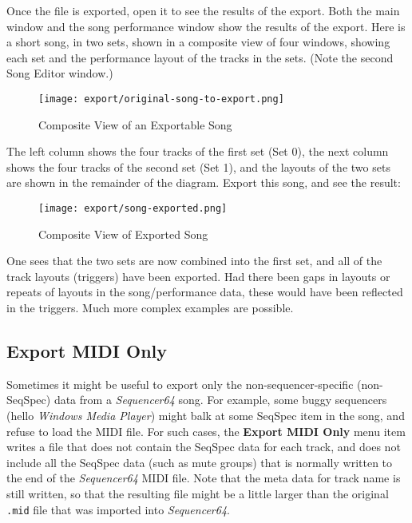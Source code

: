    Once the file is exported, open it to see
   the results of the export.  Both the main window and the
   song performance window show the results of the export.
   Here is a short song, in two sets, shown in a composite view of four windows,
   showing each set and the performance layout of the tracks in the sets.
   (Note the second Song Editor window.)

\begin{figure}[H]
   \centering 
   \texttt{[image: export/original-song-to-export.png]}
   \caption{Composite View of an Exportable Song}
   \label{fig:seq64_original_song_to_export}
\end{figure}

   The left column shows the four tracks of the first set (Set 0), the next
   column shows the four tracks of the second set (Set 1), and the
   layouts of the two sets are shown in the remainder of the diagram.
   Export this song, and see the result:

\begin{figure}[H]
   \centering 
   \texttt{[image: export/song-exported.png]}
   \caption{Composite View of Exported Song}
   \label{fig:seq64_song_exported}
\end{figure}

   One sees that the two sets are now combined into the first set,
   and all of the track layouts (triggers) have been exported.
   Had there been gaps in layouts or repeats of layouts in the song/performance
   data, these would have been reflected in the triggers.
   Much more complex examples are possible.

\subsection{Export MIDI Only}
\label{subsec:seq64_midi_export_file_export_midi_only}

   Sometimes it might be useful to export only the non-sequencer-specific
   (non-SeqSpec) data from a \textsl{Sequencer64} song.
   For example, some buggy sequencers
   (hello \textsl{Windows Media Player})
   might balk at some SeqSpec item in the song, and refuse to load the MIDI
   file.
   For such cases,
   the \textbf{Export MIDI Only} menu item writes a file that does not contain
   the SeqSpec data for each track, and does not include all the SeqSpec data
   (such as mute groups) that is normally written to the end of the
   \textsl{Sequencer64} MIDI file.
   Note that the meta data for track name is still written, so that the
   resulting file might be a little larger than the original
   \texttt{.mid} file that was imported into \textsl{Sequencer64}.


